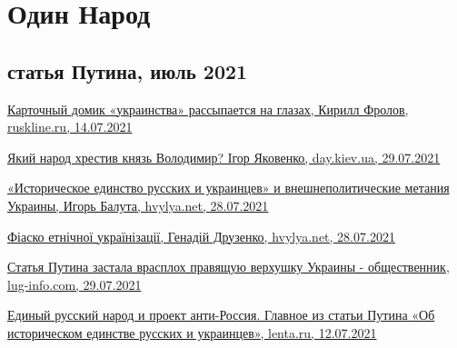  
 
 
 
 
\chapter{Один Народ}
\label{sec:topics.odin_narod}

\section{статья Путина, июль 2021}



\href{https://ruskline.ru/news_rl/2021/07/14/kartochnyi_domik_ukrainstva_rassypaetsya_na_glazah}{%
Карточный домик «украинства» рассыпается на глазах, Кирилл Фролов, ruskline.ru, 14.07.2021%
}

\href{https://day.kyiv.ua/uk/blog/suspilstvo/yakyy-narod-hrestyv-knyaz-volodymyr}{%
Який народ хрестив князь Володимир? Ігор Яковенко, day.kiev.ua, 29.07.2021%
}

\href{https://analytics.hvylya.net/234637-istoricheskoe-edinstvo-russkih-i-ukraincev-i-vneshnepoliticheskie-metaniya-ukrainy}{%
«Историческое единство русских и украинцев» и внешнеполитические метания Украины, Игорь Балута, hvylya.net, 28.07.2021%
}

\href{https://analytics.hvylya.net/234631-fiasko-etnichnoji-ukrajinizaciji}{%
Фіаско етнічної українізації, Генадій Друзенко, hvylya.net, 28.07.2021%
}

\href{https://lug-info.com/news/stat-a-putina-zastala-vrasploh-pravasuu-verhusku-ukrainy-obsestvennik}{%
Статья Путина застала врасплох правящую верхушку Украины - общественник, lug-info.com, 29.07.2021%
}

\href{https://lenta.ru/brief/2021/07/12/odin_narod/}{%
Единый русский народ и проект анти-Россия. Главное из статьи Путина «Об историческом единстве русских и украинцев», %
lenta.ru, 12.07.2021%
}

